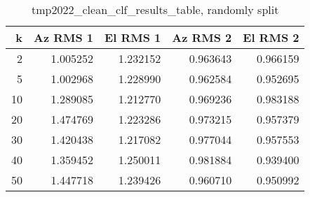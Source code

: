 \begin{table}[h]
    \centering
    \caption{tmp2022_clean_clf_results_table, randomly split}
    \begin{tabular}{rrrrr}
        \toprule
         k & Az RMS 1 & El RMS 1 & Az RMS 2 & El RMS 2 \\
        \midrule
         2 &  1.005252 & 1.232152 &  0.963643 &  0.966159 \\
         5 &  1.002968 & 1.228990 &  0.962584 &  0.952695 \\
        10 &  1.289085 & 1.212770 &  0.969236 &  0.983188 \\
        20 &  1.474769 & 1.223286 &  0.973215 &  0.957379 \\
        30 &  1.420438 & 1.217082 &  0.977044 &  0.957553 \\
        40 &  1.359452 & 1.250011 &  0.981884 &  0.939400 \\
        50 &  1.447718 & 1.239426 &  0.960710 &  0.950992 \\
        \bottomrule
    \end{tabular}
\end{table}

